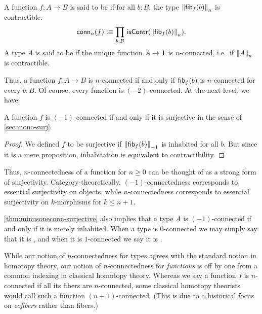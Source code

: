 \begin{defn}
A function $f:A\to B$ is said to be 
%
%
if for all $b:B$, the type $\trunc n{\hfiber f b}$ is contractible:
\begin{equation*}
  \mathsf{conn}_n(f)\defeq \prd{b:B}\iscontr(\trunc n{\hfiber{f}b}). 
\end{equation*}
A type $A$ is said to be 
%
%
 if the unique function $A\to\unit$ is $n$-connected, i.e.\ if $\trunc nA$ is contractible.
\end{defn}

Thus, a function $f:A\to B$ is $n$-connected if and only if $\hfib{f}b$ is $n$-connected for every $b:B$.
Of course, every function is $(-2)$-connected.
At the next level, we have:

\begin{lem}\label{thm:minusoneconn-surjective}
  A function $f$ is $(-1)$-connected if and only if it is surjective in the sense of \autoref{sec:mono-surj}.
\end{lem}
\begin{proof}
  We defined $f$ to be surjective if $\trunc{-1}{\hfiber f b}$ is inhabited for all $b$.
  But since it is a mere proposition, inhabitation is equivalent to contractibility.
\end{proof}

Thus, $n$-connectedness of a function for $n\ge 0$ can be thought of as a strong form of surjectivity.
Category-theoretically, $(-1)$-connectedness corresponds to essential surjectivity on objects, while $n$-connectedness corresponds to essential surjectivity on $k$-morphisms for $k\le n+1$.

\autoref{thm:minusoneconn-surjective} also implies that a type $A$ is $(-1)$-connected if and only if it is merely inhabited.
When a type is $0$-connected we may simply say that it is ,
%
%
and when it is $1$-connected we say it is .
%
%

\begin{rmk}\label{rmk:connectedness-indexing}
  While our notion of $n$-connectedness for types agrees with the standard notion in homotopy theory, our notion of $n$-connectedness for \emph{functions} is off by one from a common indexing in classical homotopy theory.
  Whereas we say a function $f$ is $n$-connected if all its fibers are $n$-connected, some classical homotopy theorists would call such a function $(n+1)$-connected.
  (This is due to a historical focus on \emph{cofibers} rather than fibers.)
\end{rmk}

